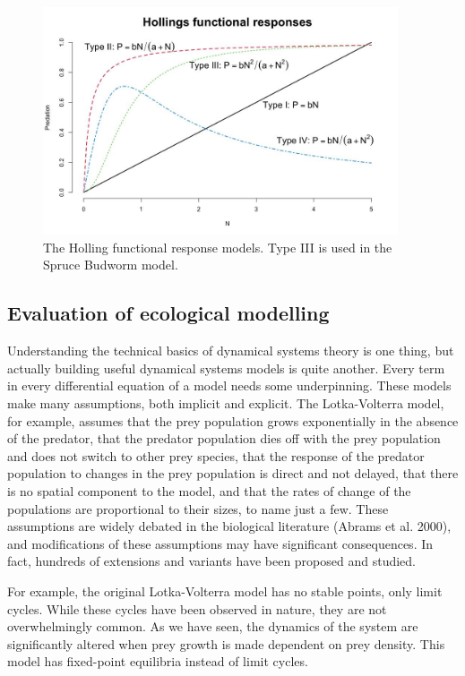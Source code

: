 \documentclass[
  letterpaper,
]{scrbook}
\begin{document}
\begin{figure}

{\centering \includegraphics[width=4.12438in,height=\textheight]{media/ch5/image5.jpg}

}

\caption{\label{fig-ch5-img5-old-53}The Holling functional response
models. Type III is used in the Spruce Budworm model.}

\end{figure}

\hypertarget{evaluation-of-ecological-modelling}{%
\subsection{Evaluation of ecological
modelling}\label{evaluation-of-ecological-modelling}}

Understanding the technical basics of dynamical systems theory is one
thing, but actually building useful dynamical systems models is quite
another. Every term in every differential equation of a model needs some
underpinning. These models make many assumptions, both implicit and
explicit. The Lotka-Volterra model, for example, assumes that the prey
population grows exponentially in the absence of the predator, that the
predator population dies off with the prey population and does not
switch to other prey species, that the response of the predator
population to changes in the prey population is direct and not delayed,
that there is no spatial component to the model, and that the rates of
change of the populations are proportional to their sizes, to name just
a few. These assumptions are widely debated in the biological literature
(Abrams et al. 2000), and modifications of these assumptions may have
significant consequences. In fact, hundreds of extensions and variants
have been proposed and studied.

For example, the original Lotka-Volterra model has no stable points,
only limit cycles. While these cycles have been observed in nature, they
are not overwhelmingly common. As we have seen, the dynamics of the
system are significantly altered when prey growth is made dependent on
prey density. This model has fixed-point equilibria instead of limit
cycles.
\end{document}
